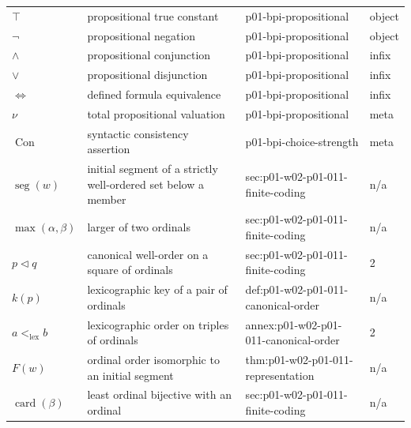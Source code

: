 \begin{longtable}{@{}p{}p{}p{}p{}@{}}
\(\top\) & propositional true constant & p01-\allowbreak{}bpi-\allowbreak{}propositional & object \\
\(\neg\) & propositional negation & p01-\allowbreak{}bpi-\allowbreak{}propositional & object \\
\(\land\) & propositional conjunction & p01-\allowbreak{}bpi-\allowbreak{}propositional & infix \\
\(\lor\) & propositional disjunction & p01-\allowbreak{}bpi-\allowbreak{}propositional & infix \\
\(\Leftrightarrow\) & defined formula equivalence & p01-\allowbreak{}bpi-\allowbreak{}propositional & infix \\
\(\nu\) & total propositional valuation & p01-\allowbreak{}bpi-\allowbreak{}propositional & meta \\
\(\operatorname{Con}\) & syntactic consistency assertion & p01-\allowbreak{}bpi-\allowbreak{}choice-\allowbreak{}strength & meta \\
\(\operatorname{seg}(w)\) & initial segment of a strictly well-ordered set below a member & sec:\allowbreak{}p01-\allowbreak{}w02-\allowbreak{}p01-\allowbreak{}011-\allowbreak{}finite-\allowbreak{}coding & n/a \\
\(\max(\alpha,\allowbreak \beta)\) & larger of two ordinals & sec:\allowbreak{}p01-\allowbreak{}w02-\allowbreak{}p01-\allowbreak{}011-\allowbreak{}finite-\allowbreak{}coding & n/a \\
\(p\lhd q\) & canonical well-order on a square of ordinals & sec:\allowbreak{}p01-\allowbreak{}w02-\allowbreak{}p01-\allowbreak{}011-\allowbreak{}finite-\allowbreak{}coding & 2 \\
\(k(p)\) & lexicographic key of a pair of ordinals & def:\allowbreak{}p01-\allowbreak{}w02-\allowbreak{}p01-\allowbreak{}011-\allowbreak{}canonical-\allowbreak{}order & n/a \\
\(a<_{\mathrm{lex}}b\) & lexicographic order on triples of ordinals & annex:\allowbreak{}p01-\allowbreak{}w02-\allowbreak{}p01-\allowbreak{}011-\allowbreak{}canonical-\allowbreak{}order & 2 \\
\(F(w)\) & ordinal order isomorphic to an initial segment & thm:\allowbreak{}p01-\allowbreak{}w02-\allowbreak{}p01-\allowbreak{}011-\allowbreak{}representation & n/a \\
\(\operatorname{card}(\beta)\) & least ordinal bijective with an ordinal & sec:\allowbreak{}p01-\allowbreak{}w02-\allowbreak{}p01-\allowbreak{}011-\allowbreak{}finite-\allowbreak{}coding & n/a \\

\end{longtable}
